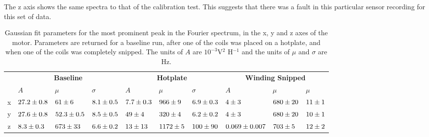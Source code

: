 The z axis shows the same spectra to that of the calibration test. This suggests that there was a fault in this particular sensor recording for this set of data.

\begin{table}[t]
\centering
\begin{tabular}{|c|p{1.2cm}p{1.2cm}p{1.2cm}|p{1.2cm}p{1.2cm}p{1.2cm}|p{1.2cm}p{1.2cm}p{1.2cm}|}
\hline
  & \multicolumn{3}{c|}{\textbf{Baseline}}                    & \multicolumn{3}{c|}{\textbf{Hotplate}}                & \multicolumn{3}{c|}{\textbf{Winding Snipped}}         \\ \cline{2-10} 
  & $A$            & $\mu$           & $\sigma$      & $A$           & $\mu$        & $\sigma$      & $A$               & $\mu$        & $\mu$      \\ \hline
x & $27.2 \newline \pm 0.8$ & $61 \newline \pm 6$      & $8.1 \newline \pm 0.5$ & $7.7 \newline \pm 0.3$ & $966 \newline \pm 9$  & $6.9 \newline \pm 0.3$ & $4 \newline \pm 3$         & $680 \newline \pm 20$ & $11 \newline \pm 1$ \\
y & $27.6 \newline \pm 0.8$ & $52.3 \newline \pm 0.5 $ & $8.5 \newline \pm 0.5$ & $49 \newline \pm 4$    & $320 \newline \pm 4$  & $6.2 \newline \pm 0.2$ & $4 \newline \pm 3$         & $680 \newline \pm 20$ & $10 \newline \pm 1$ \\
z & $8.3 \newline \pm 0.3$  & $673 \newline \pm 33$    & $6.6 \newline \pm 0.2$ & $13 \newline \pm 13$   & $1172 \newline \pm 5$ & $100 \newline \pm 90$  & $0.069 \newline \pm 0.007$ & $703 \newline \pm 5$  & $12 \newline \pm 2$ \\ \hline
\end{tabular}
\caption[Gaussian Fit Parameters for Overheating]{Gaussian fit parameters for the most prominent peak in the Fourier spectrum, in the x, y and z axes of the motor. Parameters are returned for a baseline run, after one of the coils was placed on a hotplate, and when one of the coils was completely snipped. The units of $A$ are $10^{-3}$V$^2$ H$^{-1}$ and the units of $\mu$ and $\sigma$ are Hz.}
\label{table:overheating_table}
\end{table}

